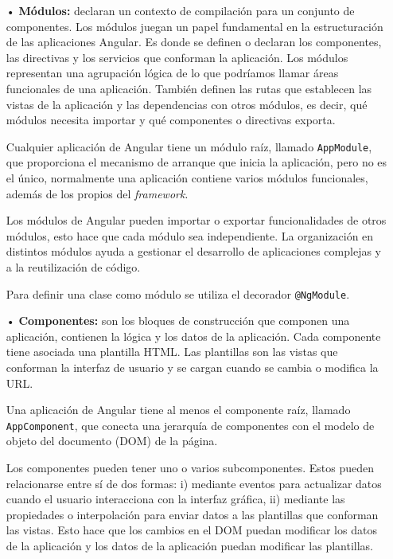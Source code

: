 \documentclass[a4paper, 12pt]{book}
\begin{document}
\begin{itemize}

	\item[•] \textbf{Módulos:} declaran un contexto de compilación para un conjunto de componentes. 
	Los módulos juegan un papel fundamental en la estructuración de las aplicaciones Angular. 
	Es donde se definen o declaran los componentes, las directivas y los servicios que conforman la aplicación. 
	Los módulos representan una agrupación lógica de lo que podríamos llamar áreas funcionales de una aplicación. 
	También definen las rutas que establecen las vistas de la aplicación y las dependencias con otros módulos, es decir, qué módulos necesita importar y qué componentes o directivas exporta. 
	
	Cualquier aplicación de Angular tiene un módulo raíz, llamado \texttt{AppModule}, que proporciona el mecanismo de arranque que inicia la aplicación, pero no es el único, normalmente una aplicación contiene varios módulos funcionales, además de los propios del \emph{framework}. 
	
	Los módulos de Angular pueden importar o exportar funcionalidades de otros módulos, esto hace que cada módulo sea independiente. 
	La organización en distintos módulos ayuda a gestionar el desarrollo de aplicaciones complejas y a la reutilización de código.
	
	Para definir una clase como módulo se utiliza el decorador \texttt{@NgModule}.
	
	\item[•] \textbf{Componentes:} son los bloques de construcción que componen una aplicación, contienen la lógica y los datos de la aplicación. 
	Cada componente tiene asociada una plantilla HTML. Las plantillas son las vistas que conforman la interfaz de usuario y se cargan cuando se cambia o modifica la URL.
	
	Una aplicación de Angular tiene al menos el componente raíz, llamado \texttt{AppComponent}, que conecta una jerarquía de componentes con el modelo de objeto del documento (DOM) de la página.
	
	Los componentes pueden tener uno o varios subcomponentes. Estos pueden relacionarse entre sí de dos formas: i) mediante eventos para actualizar datos cuando el usuario interacciona con la interfaz gráfica, ii) mediante las propiedades o interpolación para enviar datos a las plantillas que conforman las vistas. 
	Esto hace que los cambios en el DOM puedan modificar los datos de la aplicación y los datos de la aplicación puedan modificar las plantillas.
	

\end{itemize}
\end{document}
